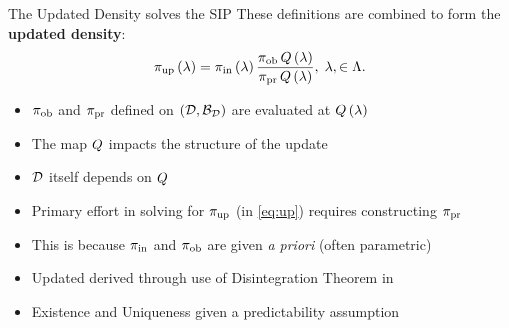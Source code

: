 \begin{frame}[t]{The Updated Density solves the SIP}
These definitions are combined to form the \textbf{updated density}:
\begin{equation}\label{eq:up}
\operatorname*{\pi_{up}} \left ( \lambda \right ) = \operatorname*{\pi_{in}} \left ( \lambda \right ) \frac{\operatorname*{\pi_{ob}} Q\left ( \lambda \right ) }{\operatorname*{\pi_{pr}} Q\left ( \lambda \right ) }, \; \lambda, \in {\Lambda}.
\end{equation}

\begin{itemize}
	\item $\operatorname*{\pi_{ob}}$ and $\operatorname*{\pi_{pr}}$ defined on $(\mathcal{D}, \mathcal{B}_{\mathcal{D}})$ are evaluated at $Q\left ( \lambda \right )$
	\item The map $Q$ impacts the structure of the update
	\item $\mathcal{D}$ itself depends on $Q$
	\item Primary effort in solving for $\operatorname*{\pi_{up}}$ (in \eqref{eq:up}) requires constructing $\operatorname*{\pi_{pr}}$
	\item This is because $\operatorname*{\pi_{in}}$ and $\operatorname*{\pi_{ob}}$ are given \emph{a priori} (often parametric)
	\item Updated derived through use of Disintegration Theorem in \cite{BJW18}
	\item Existence and Uniqueness given a predictability assumption
\end{itemize}
\end{frame}



